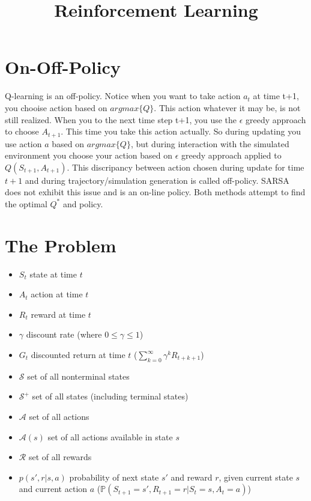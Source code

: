 \documentclass[12pt]{amsart}
\title{Reinforcement Learning}
\begin{document}
\maketitle
\thispagestyle{fancy}


\section{On-Off-Policy}

Q-learning is an off-policy. Notice when you want to take action $a_{t}$ at time t+1, you chooise action based on $argmax\{Q\}$. This action whatever it may be, is not still realized. When you to the next time step t+1, you use the $\epsilon$ greedy approach to choose $A_{t+1}$. This time you take this action actually. So during updating you use action $a$ based on $argmax\{Q\}$, but during interaction with the simulated environment you choose your action based on $\epsilon$ greedy approach applied to $Q(S_{t+1}, A_{t+1})$. This discripancy between action chosen during update for time $t+1$ and during trajectory/simulation generation is called off-policy. SARSA does not exhibit this issue and is an on-line policy. Both methods attempt to find the optimal $Q^*$ and policy. 



\section{The Problem}

\begin{itemize}
\item[] $S_t$ \tabto{2cm} state at time $t$
\item[] $A_t$ \tabto{2cm} action at time $t$
\item[] $R_t$ \tabto{2cm} reward at time $t$
\item[] $\gamma$ \tabto{2cm} discount rate (where $0 \leq \gamma \leq 1$)
\item[] $G_t$ \tabto{2cm} discounted return at time $t$ ($\sum_{k=0}^\infty \gamma^k R_{t+k+1}$)
\item[] $\mathcal{S}$ \tabto{2cm} set of all nonterminal states
\item[] $\mathcal{S}^+$ \tabto{2cm} set of all states (including terminal states)
\item[] $\mathcal{A}$ \tabto{2cm} set of all actions 
\item[] $\mathcal{A}(s)$ \tabto{2cm} set of all actions available in state $s$
\item[] $\mathcal{R}$ \tabto{2cm} set of all rewards
\item[] $p(s',r|s,a)$ \tabto{2cm} probability of next state $s'$ and reward $r$, given current state $s$ and current action $a$ ($\mathbb{P}(S_{t+1}=s', R_{t+1}=r|S_t = s, A_t = a)$)
\end{itemize}
\end{document}
